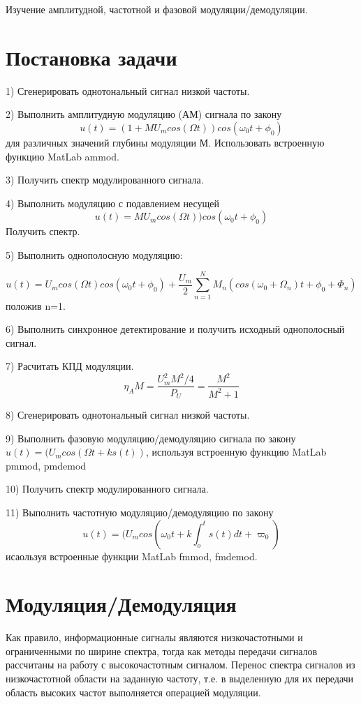 \documentclass[12pt,a4paper]{scrartcl}
\begin{document}
Изучение амплитудной, частотной и фазовой модуляции/демодуляции.\\

\section{Постановка задачи}
\label{sec:task}

1) Сгенерировать однотональный сигнал низкой частоты.

2) Выполнить амплитудную модуляцию (АМ) сигнала по закону $$u(t)=(1+MU_m cos(\Omega t))cos(\omega_0 t+\phi_0)$$ для различных значений глубины модуляции М. Использовать встроенную функцию MatLab ammod.

3) Получить спектр модулированного сигнала.

4) Выполнить модуляцию с подавлением несущей  $$u(t)=MU_m cos(\Omega t))cos(\omega_0 t+\phi_0)$$ Получить спектр.

5) Выполнить однополосную модуляцию:

$$u(t)=U_m cos(\Omega t)cos(\omega_0 t+\phi_0) + \frac{U_m}{2} \sum_{n=1}^N M_n (cos(\omega_0+\Omega_n)t+\phi_0+\Phi_n)$$
положив n=1.

6) Выполнить синхронное детектирование и получить исходный однополосный сигнал.

7) Расчитать КПД модуляции. $$\eta_A M = \frac{U_m^2 M^2/4}{P_U} = \frac{M^2}{M^2+1}$$

8) Сгенерировать однотональный сигнал низкой частоты.

9) Выполнить фазовую модуляцию/демодуляцию сигнала по закону $u(t) = (U_m cos(\Omega t+ks(t))$, используя встроенную функцию MatLab pmmod, pmdemod

10) Получить спектр модулированного сигнала.

11) Выполнить частотную модуляцию/демодуляцию по закону $$u(t) = (U_m cos(\omega_0 t+k\int_o^t s(t)dt+\varpi_0)$$ исаользуя встроенные функции MatLab fmmod, fmdemod.

\clearpage
\newpage

\section{Модуляция/Демодуляция}
\label{sec:teoriya}

Как правило, информационные сигналы являются низкочастотными и ограниченными по ширине спектра, тогда как методы передачи сигналов рассчитаны на работу с высокочастотным сигналом. Перенос спектра сигналов из низкочастотной области на заданную частоту, т.е. в выделенную для их передачи область высоких частот выполняется операцией модуляции.
\end{document}
